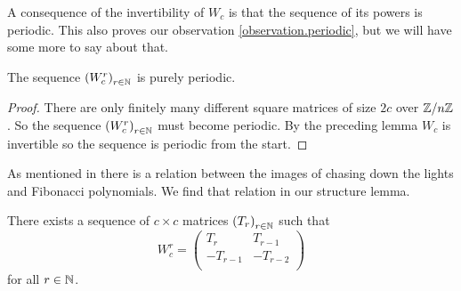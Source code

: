 A consequence of the invertibility of $W_{c}$ is that the sequence of its powers
is periodic. This also proves our observation \ref{observation.periodic}, but we
will have some more to say about that.

\begin{theorem}
  The sequence $\left(W_{c}^{r}\right)_{r\in\mathbb{N}}$ is purely periodic.
\end{theorem}

\begin{proof}
  There are only finitely many different square matrices of size $2c$ over
  $\mathbb{Z}/n\mathbb{Z}$. So the sequence $\left(W_{c}^{r}\right)_{r\in\mathbb{N}}$ must
  become periodic. By the preceding lemma $W_{c}$ is invertible so the
  sequence is periodic from the start.
\end{proof}

As mentioned in \cite{leach17} there is a relation between the images of chasing
down the lights and Fibonacci polynomials. We find that relation in our
structure lemma.

\begin{lemma}[structure]
  There exists a sequence of $c \times c$ matrices
  $\left(T_{r}\right)_{r\in\mathbb{N}}$ such that
  \[
  W_{c}^{r}
  =
  \left(
  \begin{array}{cc}
     T_{r} &  T_{r-1} \\
    -T_{r-1} & -T_{r-2}   \\
  \end{array}
  \right)
  \]
  for all $r\in\mathbb{N}$.
\end{lemma}

